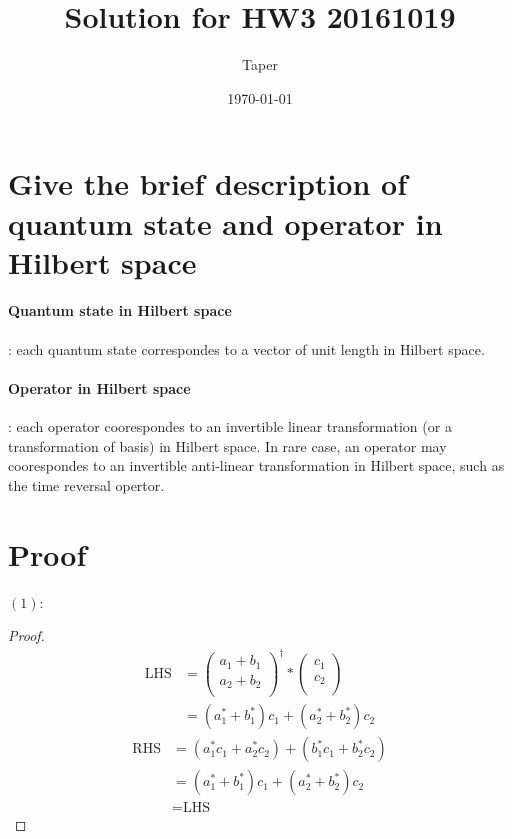 \documentclass{article}
\title{Solution for HW3 20161019}
\date{\today}
\author{Taper}
\numberwithin{equation}{subsection} %
\theoremstyle{definition}
\begin{document}
\maketitle
{}
\section{Give the brief description of quantum state and operator in
Hilbert space}

\paragraph{Quantum state in Hilbert space}: each quantum state
correspondes to a vector of unit length in Hilbert space.

\paragraph{Operator in Hilbert space}: each operator coorespondes to
an invertible linear transformation (or a transformation of basis) in
Hilbert space. In rare case, an operator may coorespondes to an
invertible anti-linear transformation in Hilbert space, such as the
time reversal opertor.

\section{Proof}

$(1)$:
\begin{proof}
\begin{align*}
    \text{LHS} &= \left( \begin{array}{c}
                     a_1 + b_1\\
                     a_2 + b_2\\
                \end{array} \right)^\dagger * 
                \left( \begin{array}{c}
                     c_1 \\
                     c_2 \\
                \end{array} \right) \\
                &= (a_1^*+b_1^*)c_1 + (a_2^*+b_2^*)c_2
\end{align*}
\begin{align*}
    \text{RHS} &= (a_1^*c_1+a_2^* c_2) + (b_1^*c_1+b_2^* c_2)  \\
               &= (a_1^*+b_1^*)c_1 + (a_2^*+b_2^*)c_2 \\
               &= \text{LHS}
\end{align*}
\end{proof}
\end{document}

